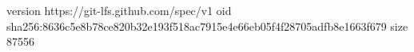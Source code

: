 version https://git-lfs.github.com/spec/v1
oid sha256:8636c5e8b78ce820b32e193f518ac7915e4e66eb05f4f28705adfb8e1663f679
size 87556
